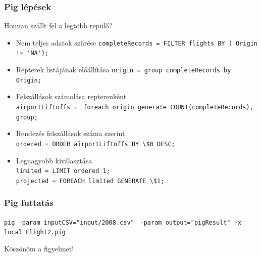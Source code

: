 \documentclass{beamer}
\begin{document}
\begin{frame}
\frametitle{Pig lépések}
Honnan szállt fel a legtöbb repülő?
\begin{itemize}
	\item Nem teljes adatok szűrése
		\lstinline[basicstyle=\ttfamily\color{black}]|completeRecords = FILTER flights BY ( Origin != 'NA');|
	\item Repterek listájának előállítása
		\lstinline[basicstyle=\ttfamily\color{black}]|origin = group completeRecords by Origin;|
	\item Felszállások számolása repterenként\\
		\lstinline[basicstyle=\ttfamily\color{black}]|airportLiftoffs = |
		\lstinline[basicstyle=\ttfamily\color{black}]|foreach origin generate COUNT(completeRecords), group;|
	\item Rendezés felszállások száma szerint\\
		\lstinline[basicstyle=\ttfamily\color{black}]|ordered = ORDER airportLiftoffs BY \$0 DESC;|
	\item Legnagyobb kiválasztása\\
		\lstinline[basicstyle=\ttfamily\color{black}]|limited = LIMIT ordered 1;|\\
		\lstinline[basicstyle=\ttfamily\color{black}]|projected = FOREACH limited GENERATE \$1;|
\end{itemize}
\end{frame}


\begin{frame}
\frametitle{Pig futtatás}
\lstinline[basicstyle=\ttfamily\color{black}]|pig -param inputCSV="input/2008.csv"|
\lstinline[basicstyle=\ttfamily\color{black}]| -param output="pigResult" -x local Flight2.pig|
\end{frame}



\begin{frame}[plain]
\Huge{\centerline{Köszönöm a figyelmet!}}
\end{frame}


\end{document}
